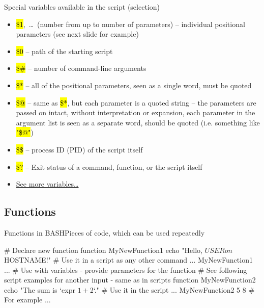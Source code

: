 \documentclass[compress, ucs, xelatex, 11pt, xcolor=svgnames,
  hyperref={
    bookmarks=true,
    unicode=true,
    colorlinks=true,
    pdftitle={Linux, command line and MetaCentrum},
    plainpages=false,
    pdfauthor={Vojtech Zeisek},
    pdfsubject={Course about use of Linux command line, writing shell scripts and using MetaCentrum of CESNET},
    pdfcreator={XeLaTeX},
    pdfkeywords={Linux, GNU, BASH, shell, command line, MetaCentrum},
    linkcolor=DarkRed,
    anchorcolor=DarkBlue,
    citecolor=Indigo,
    filecolor=NavyBlue,
    menucolor=DarkMagenta,
    urlcolor=DarkBlue,
    pdftex},
  url={hyphens, lowtilde} %
  ]{beamer}
\renewcommand{\texttt}[1]{\hl{\ttfamily #1}}
\renewcommand{\alert}[1]{\textcolor{red}{#1}}
\begin{document}
\begin{frame}{Special variables available in the script (selection)}
  \begin{itemize}
    \item \alert{\texttt{\$1}},~\ldots~(number from \texttt{1} up to number of parameters) -- individual positional parameters (see next slide for example)
    \item \alert{\texttt{\$0}} -- path of the starting script
    \item \alert{\texttt{\$\#}} -- number of command-line arguments
    \item \alert{\texttt{\$*}} -- all of the positional parameters, seen as a single word, must be quoted
    \item \alert{\texttt{\$@}} -- same as \texttt{\$*}, but each parameter is a quoted string -- the parameters are passed on intact, without interpretation or expansion, each parameter in the argument list is seen as a separate word, should be quoted (i.e. something like \texttt{"\$@"})
    \item \alert{\texttt{\$\$}} -- process ID (PID) of the script itself
    \item \alert{\texttt{\$?}} -- Exit status of a command, function, or the script itself
    \item \href{http://www.tldp.org/LDP/abs/html/internalvariables.html}{See more variables\ldots}
  \end{itemize}
\end{frame}

\subsection{Functions}

\begin{frame}[fragile]{Functions in BASH}{Pieces of code, which can be used repeatedly}
  \begin{bashcode}
    # Declare new function
    function MyNewFunction1 {
      echo "Hello, $USER on $HOSTNAME!"
      }
    # Use it in a script as any other command
    ...
    MyNewFunction1
    ...
    # Use with variables - provide parameters for the function
    # See following script examples for another input - same as in scripts
    function MyNewFunction2 {
      echo "The sum is `expr $1 + $2`."
      }
    # Use it in the script
    ...
    MyNewFunction2 5 8 # For example
    ...
  \end{bashcode}
\end{frame}
\end{document}
